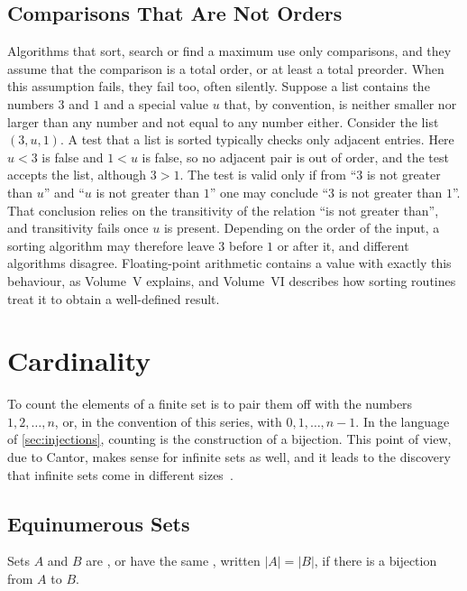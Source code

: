 \subsection{Comparisons That Are Not Orders}

Algorithms that sort, search or find a maximum use only comparisons, and they assume that the comparison is a total order, or at least a total preorder. When this assumption fails, they fail too, often silently. Suppose a list contains the numbers $3$ and $1$ and a special value $u$ that, by convention, is neither smaller nor larger than any number and not equal to any number either. Consider the list $(3,u,1)$. A test that a list is sorted typically checks only adjacent entries. Here $u<3$ is false and $1<u$ is false, so no adjacent pair is out of order, and the test accepts the list, although $3>1$. The test is valid only if from ``$3$ is not greater than $u$'' and ``$u$ is not greater than $1$'' one may conclude ``$3$ is not greater than $1$''. That conclusion relies on the transitivity of the relation ``is not greater than'', and transitivity fails once $u$ is present. Depending on the order of the input, a sorting algorithm may therefore leave $3$ before $1$ or after it, and different algorithms disagree. Floating-point arithmetic contains a value with exactly this behaviour, as Volume~V explains, and Volume~VI describes how sorting routines treat it to obtain a well-defined result.

\section{Cardinality}
\label{sec:cardinality}

To count the elements of a finite set is to pair them off with the numbers $1,2,\ldots,n$, or, in the convention of this series, with $0,1,\ldots,n-1$. In the language of \cref{sec:injections}, counting is the construction of a bijection. This point of view, due to Cantor, makes sense for infinite sets as well, and it leads to the discovery that infinite sets come in different sizes~\cite{cantor1874,cantor1891}.

\subsection{Equinumerous Sets}

\begin{definition}
\label{def:equinumerous}
Sets $A$ and $B$ are , or have the same , written $|A|=|B|$, if there is a bijection from $A$ to $B$.
\end{definition}

